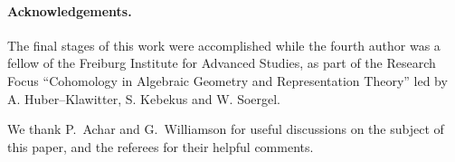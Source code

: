 \paragraph{Acknowledgements.}

The final stages of this work were accomplished while the fourth author was a fellow of the Freiburg Institute for Advanced Studies, as part of the Research Focus ``Cohomology in Algebraic Geometry and Representation Theory'' led by A. Huber--Klawitter, S. Kebekus and W. Soergel.

We thank P.~Achar and G.~Williamson for useful discussions on the subject of this paper, and the referees for their helpful comments.

